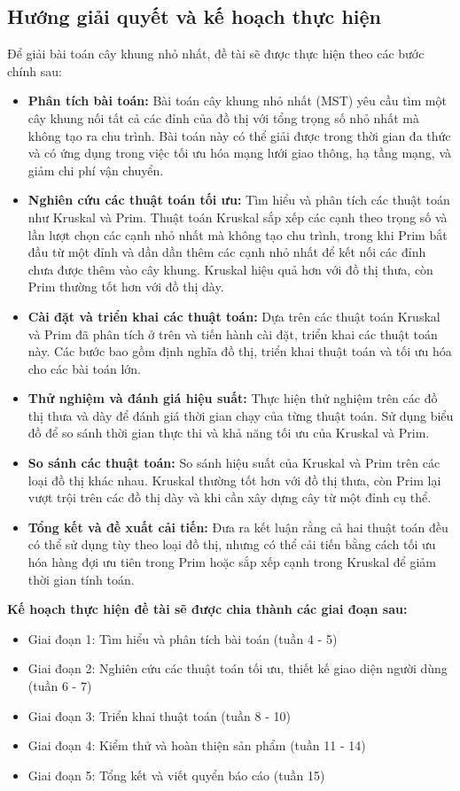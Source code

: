 \subsection{Hướng giải quyết và kế hoạch thực hiện}
Để giải bài toán cây khung nhỏ nhất, đề tài sẽ được thực hiện theo các bước chính sau:
\begin{itemize}
    \item \textbf{Phân tích bài toán:} Bài toán cây khung nhỏ nhất (MST) yêu cầu tìm một cây khung nối tất cả các đỉnh của đồ thị với tổng trọng số nhỏ nhất mà không tạo ra chu trình. Bài toán này có thể giải được trong thời gian đa thức và có ứng dụng trong việc tối ưu hóa mạng lưới giao thông, hạ tầng mạng, và giảm chi phí vận chuyển.
    \item \textbf{Nghiên cứu các thuật toán tối ưu:} Tìm hiểu và phân tích các thuật toán như Kruskal và Prim. Thuật toán Kruskal sắp xếp các cạnh theo trọng số và lần lượt chọn các cạnh nhỏ nhất mà không tạo chu trình, trong khi Prim bắt đầu từ một đỉnh và dần dần thêm các cạnh nhỏ nhất để kết nối các đỉnh chưa được thêm vào cây khung. Kruskal hiệu quả hơn với đồ thị thưa, còn Prim thường tốt hơn với đồ thị dày.
    \item \textbf{Cài đặt và triển khai các thuật toán:} Dựa trên các thuật toán Kruskal và Prim đã phân tích ở trên và tiến hành cài đặt, triển khai các thuật toán này. Các bước bao gồm định nghĩa đồ thị, triển khai thuật toán và tối ưu hóa cho các bài toán lớn.
    \item \textbf{Thử nghiệm và đánh giá hiệu suất:} Thực hiện thử nghiệm trên các đồ thị thưa và dày để đánh giá thời gian chạy của từng thuật toán. Sử dụng biểu đồ để so sánh thời gian thực thi và khả năng tối ưu của Kruskal và Prim.
    \item \textbf{So sánh các thuật toán:} So sánh hiệu suất của Kruskal và Prim trên các loại đồ thị khác nhau. Kruskal thường tốt hơn với đồ thị thưa, còn Prim lại vượt trội trên các đồ thị dày và khi cần xây dựng cây từ một đỉnh cụ thể.
    \item \textbf{Tổng kết và đề xuất cải tiến:} Đưa ra kết luận rằng cả hai thuật toán đều có thể sử dụng tùy theo loại đồ thị, nhưng có thể cải tiến bằng cách tối ưu hóa hàng đợi ưu tiên trong Prim hoặc sắp xếp cạnh trong Kruskal để giảm thời gian tính toán.
\end{itemize}

\textbf{Kế hoạch thực hiện đề tài sẽ được chia thành các giai đoạn sau:}
\begin{itemize} 
    \item Giai đoạn 1: Tìm hiểu và phân tích bài toán (tuần 4 - 5) 
    
    \item Giai đoạn 2: Nghiên cứu các thuật toán tối ưu, thiết kế giao diện người dùng (tuần 6 - 7) 
    
    \item Giai đoạn 3: Triển khai thuật toán (tuần 8 - 10) 
    
    \item Giai đoạn 4: Kiểm thử và hoàn thiện sản phẩm (tuần 11 - 14) 
    
    \item Giai đoạn 5: Tổng kết và viết quyển báo cáo (tuần 15) 
\end{itemize}